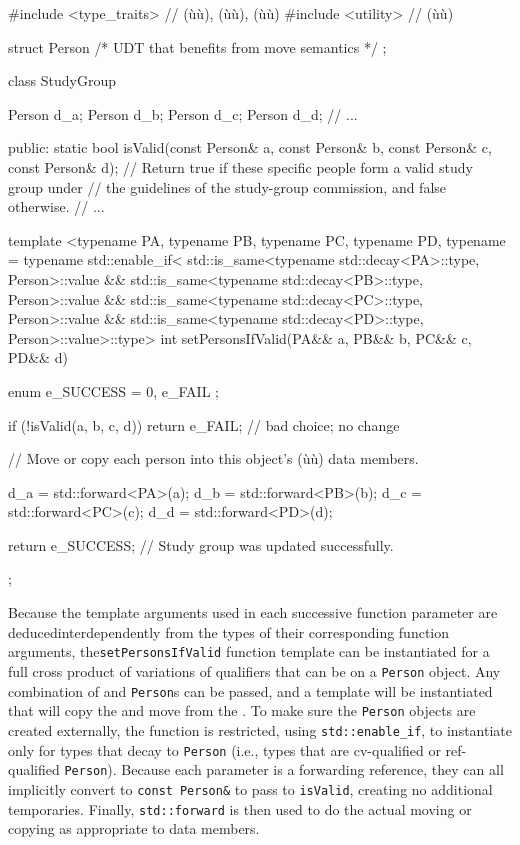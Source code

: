 \begin{emcppslisting}
#include <type_traits>  // (ù{}ù), (ù{}ù), (ù{}ù)
#include <utility>      // (ù{}ù)

struct Person { /* UDT that benefits from move semantics */ };

class StudyGroup
{
    Person d_a;
    Person d_b;
    Person d_c;
    Person d_d;
    // ...

public: 
    static bool isValid(const Person& a, const Person& b,
                        const Person& c, const Person& d);
        // Return true if these specific people form a valid study group under
        // the guidelines of the study-group commission, and false otherwise.
    // ...

    template <typename PA, typename PB, typename PC, typename PD,
        typename = typename std::enable_if<
            std::is_same<typename std::decay<PA>::type, Person>::value &&
            std::is_same<typename std::decay<PB>::type, Person>::value &&
            std::is_same<typename std::decay<PC>::type, Person>::value &&
            std::is_same<typename std::decay<PD>::type, Person>::value>::type>
    int setPersonsIfValid(PA&& a, PB&& b, PC&& c, PD&& d)
    {
        enum { e_SUCCESS = 0, e_FAIL };

        if (!isValid(a, b, c, d))
        {
            return e_FAIL;  // bad choice; no change
        }

        // Move or copy each person into this object's (ù{}ù) data members.
        
        d_a = std::forward<PA>(a);
        d_b = std::forward<PB>(b);
        d_c = std::forward<PC>(c);
        d_d = std::forward<PD>(d);

        return e_SUCCESS;  // Study group was updated successfully.
    }
};
\end{emcppslisting}

\noindent Because the template arguments used in each successive function parameter are deduced\linebreak[4] interdependently from the types of their corresponding function arguments, the\linebreak[4] \lstinline!setPersonsIfValid! function template can be instantiated for a full cross product of variations of qualifiers that can be
on a \lstinline!Person! object. Any combination of  and
 \lstinline!Person!s can be passed, and a template will be
instantiated that will copy the  and move from the
. To make sure the \lstinline!Person! objects are
created externally, the function is restricted, using
\lstinline!std::enable_if!, to instantiate only for types that decay to
\lstinline!Person! (i.e., types that are cv-qualified or ref-qualified
\lstinline!Person!). Because each parameter is a forwarding reference, they
can all implicitly convert to \lstinline!const!~\lstinline!Person&! to pass
to \lstinline!isValid!, creating no additional temporaries. Finally,
\lstinline!std::forward! is then used to do the actual moving or copying as
appropriate to data members.


